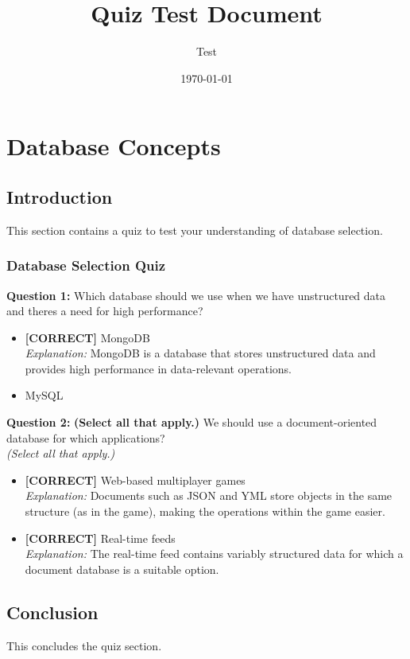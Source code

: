 \documentclass[12pt,a4paper]{book}
\title{Quiz Test Document}
\author{Test}
\date{\today}
\begin{document}
\maketitle

\chapter{Database Concepts}

\section{Introduction}

This section contains a quiz to test your understanding of database selection.

\subsection*{Database Selection Quiz}
\vspace{0.3cm}
\noindent
\textbf{Question 1:} Which database should we use when we have unstructured data and there\textquotesingle s a need for high performance?
\\[0.2cm]
\begin{itemize}
    \item \textbf{[CORRECT]} MongoDB
\\[0.1cm]
\textit{Explanation:} 
MongoDB is a database that stores unstructured data and provides high performance in data-relevant operations.
    \item MySQL
\end{itemize}
\vspace{0.3cm}
\noindent
\textbf{Question 2:} \textbf{(Select all that apply.)} We should use a document-oriented database for which applications?
\\
\textit{(Select all that apply.)}
\\[0.2cm]
\begin{itemize}
    \item \textbf{[CORRECT]} Web-based multiplayer games
\\[0.1cm]
\textit{Explanation:} 
Documents such as JSON and YML store objects in the same structure (as in the game), making the operations within the game easier.
    \item \textbf{[CORRECT]} Real-time feeds
\\[0.1cm]
\textit{Explanation:} 
The real-time feed contains variably structured data for which a document database is a suitable option.
\end{itemize}

\section{Conclusion}

This concludes the quiz section.
\end{document}
